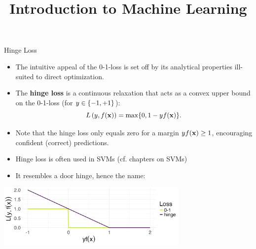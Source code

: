 \documentclass[11pt,compress,t,notes=noshow, xcolor=table]{beamer}
\title{Introduction to Machine Learning}
\begin{document}
    

\begin{vbframe}{Hinge Loss}

\begin{itemize}
  \item The intuitive appeal of the 0-1-loss is set off by its analytical
  properties ill-suited to direct optimization.
  \item The \textbf{hinge loss} is a continuous relaxation that acts as a convex 
  upper bound on the 0-1-loss (for $y \in \{-1, +1\}$): 
  $$L\left(y, f(\mathbf{x})\right) = \max \{ 0, 1 - yf(\mathbf{x}) \}.$$
  \item Note that the hinge loss only equals zero for a margin $yf(\mathbf{x})\geq 1$, 
  encouraging confident (correct) predictions.
  \item Hinge loss is often used in SVMs (cf. chapters on SVMs)
  \item It resembles a door hinge, hence the name:
\end{itemize}

\begin{center}
\includegraphics[width = 0.7\textwidth]{figure/hinge.png}
\end{center}

\end{vbframe}
\end{document}
